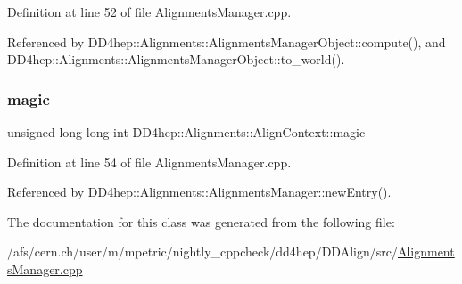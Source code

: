 Definition at line 52 of file Alignments\+Manager.\+cpp.



Referenced by D\+D4hep\+::\+Alignments\+::\+Alignments\+Manager\+Object\+::compute(), and D\+D4hep\+::\+Alignments\+::\+Alignments\+Manager\+Object\+::to\+\_\+world().

\hypertarget{class_d_d4hep_1_1_alignments_1_1_align_context_ab1fa723ae13a70098621bf9f91decf62}{}\label{class_d_d4hep_1_1_alignments_1_1_align_context_ab1fa723ae13a70098621bf9f91decf62} 
\subsubsection{\texorpdfstring{magic}{magic}}
{\footnotesize\ttfamily unsigned long long int D\+D4hep\+::\+Alignments\+::\+Align\+Context\+::magic}



Definition at line 54 of file Alignments\+Manager.\+cpp.



Referenced by D\+D4hep\+::\+Alignments\+::\+Alignments\+Manager\+::new\+Entry().



The documentation for this class was generated from the following file\+:\begin{DoxyCompactItemize}
\item 
/afs/cern.\+ch/user/m/mpetric/nightly\+\_\+cppcheck/dd4hep/\+D\+D\+Align/src/\hyperlink{_alignments_manager_8cpp}{Alignments\+Manager.\+cpp}\end{DoxyCompactItemize}
